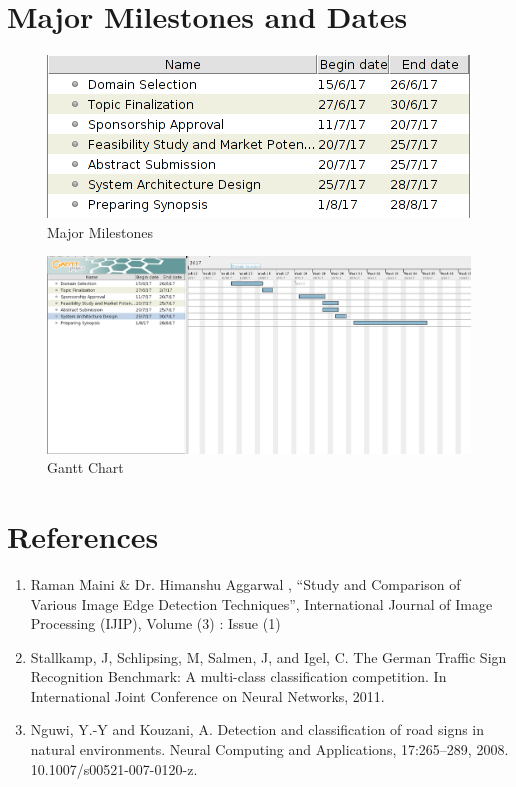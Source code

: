 \documentclass[12pt,a4paper,final]{article}
\begin{document}
\begin{flushleft}
\section{Major Milestones and Dates}
\begin{figure}[H]
\begin{center}
\includegraphics[scale=1]{majormilestones.png}
\caption{Major Milestones}
\end{center}
\end{figure}
\begin{figure}[H]
\begin{center}
\includegraphics[scale=0.35]{gantt.png}
\caption{Gantt Chart}
\end{center}
\end{figure}

\section{References}
\begin{enumerate}
\item
Raman Maini \& Dr. Himanshu Aggarwal , “Study and Comparison of Various Image Edge Detection Techniques”, International Journal of Image Processing (IJIP), Volume (3) : Issue (1)
\item
Stallkamp, J, Schlipsing, M, Salmen, J, and Igel, C. The German Traffic Sign Recognition Benchmark: A multi-class classification competition. In International Joint Conference on Neural Networks, 2011.
\item 
Nguwi, Y.-Y and Kouzani, A. Detection and classification of road signs in natural environments. Neural Computing and Applications, 17:265–289, 2008. 10.1007/s00521-007-0120-z.

\end{enumerate}

\end{flushleft}
\end{document}

